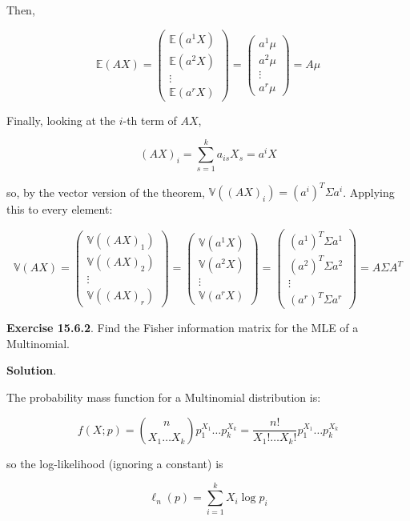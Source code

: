 Then,

\[ \mathbb{E}(AX) = \begin{pmatrix}
\mathbb{E}(a^1 X) \\
\mathbb{E}(a^2 X) \\
\vdots \\
\mathbb{E}(a^r X)
\end{pmatrix} = \begin{pmatrix}
a^1 \mu \\
a^2 \mu \\
\vdots \\
a^r \mu
\end{pmatrix} = A\mu
\]

Finally, looking at the \(i\)-th term of \(AX\),

\[(AX)_i = \sum_{s=1}^k a_{is} X_s = a^i X\]

so, by the vector version of the theorem,
\(\mathbb{V}((AX)_i) = (a^i)^T \Sigma a^i\). Applying this to every
element:

\[\mathbb{V}(AX) = \begin{pmatrix}
\mathbb{V}((AX)_1) \\
\mathbb{V}((AX)_2) \\
\vdots \\
\mathbb{V}((AX)_r)
\end{pmatrix} = \begin{pmatrix}
\mathbb{V}(a^1 X) \\
\mathbb{V}(a^2 X) \\
\vdots \\
\mathbb{V}(a^r X)
\end{pmatrix} = \begin{pmatrix}
(a^1)^T \Sigma a^1 \\
(a^2)^T \Sigma a^2 \\
\vdots \\
(a^r)^T \Sigma a^r
\end{pmatrix} = A \Sigma A^T\]

\textbf{Exercise 15.6.2}. Find the Fisher information matrix for the MLE
of a Multinomial.

\textbf{Solution}.

The probability mass function for a Multinomial distribution is:

\[ f(X; p) = \binom{n}{X_1 \dots X_k} p_1^{X_1} \dots p_k^{X_k} = \frac{n!}{X_1! \dots X_k!} p_1^{X_1} \dots p_k^{X_k}\]

so the log-likelihood (ignoring a constant) is

\[ \ell_n(p) = \sum_{i=1}^k X_i \log p_i\]

